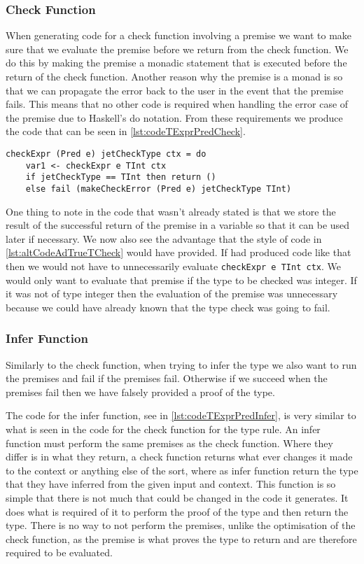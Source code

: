 \subsubsection{Check Function}
When generating code for a check function involving a premise we want to make sure that we evaluate the premise before we return from the check function.
We do this by making the premise a monadic statement that is executed before the return of the check function.
Another reason why the premise is a monad is so that we can propagate the error back to the user in the event that the premise fails.
This means that no other code is required when handling the error case of the premise due to Haskell's do notation.
From these requirements we produce the code that can be seen in \autoref{lst:codeTExprPredCheck}.

\begin{lstlisting}[caption = Code generated for checkExpr from TExprPred, label=lst:codeTExprPredCheck]
checkExpr (Pred e) jetCheckType ctx = do
    var1 <- checkExpr e TInt ctx
    if jetCheckType == TInt then return () 
    else fail (makeCheckError (Pred e) jetCheckType TInt)
\end{lstlisting}

One thing to note in the code that wasn't already stated is that we store the result of the successful return of the premise in a variable so that it can be used later if necessary.
We now also see the advantage that the style of code in \autoref{lst:altCodeAdTrueTCheck} would have provided.
If had produced code like that then we would not have to unnecessarily evaluate \texttt{checkExpr e TInt ctx}.
We would only want to evaluate that premise if the type to be checked was integer.
If it was not of type integer then the evaluation of the premise was unnecessary because we could have already known that the type check was going to fail.

\subsubsection{Infer Function}
Similarly to the check function, when trying to infer the type we also want to run the premises and fail if the premises fail.
Otherwise if we succeed when the premises fail then we have falsely provided a proof of the type.

The code for the infer function, see in \autoref{lst:codeTExprPredInfer}, is very similar to what is seen in the code for the check function for the type rule.
An infer function must perform the same premises as the check function.
Where they differ is in what they return, a check function returns what ever changes it made to the context or anything else of the sort, where as infer function return the type that they have inferred from the given input and context.
This function is so simple that there is not much that could be changed in the code it generates.
It does what is required of it to perform the proof of the type and then return the type.
There is no way to not perform the premises, unlike the optimisation of the check function, as the premise is what proves the type to return and are therefore required to be evaluated.

